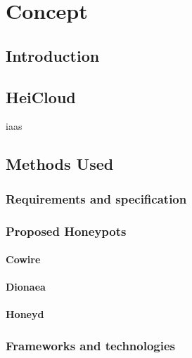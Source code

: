 \chapter{Concept}

\section{Introduction}


\section{HeiCloud}

\ac{iaas}
\cite{heicloud2021}

\section{Methods Used}

\subsection{Requirements and specification}

\subsection{Proposed Honeypots}

\subsubsection{Cowire}

\subsubsection{Dionaea}

\subsubsection{Honeyd}


\subsection{Frameworks and technologies}


